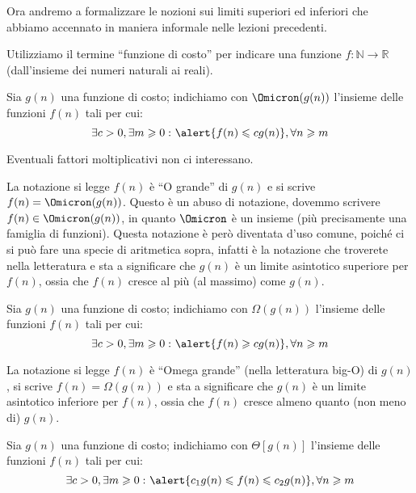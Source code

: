 Ora andremo a formalizzare le nozioni sui limiti superiori ed inferiori che abbiamo accennato in maniera informale nelle lezioni precedenti.

\begin{definition*}
Utilizziamo il termine \enquote{funzione di costo} per indicare una funzione \(f\colon\mathbb{N}\to\mathbb{R}\) (dall'insieme dei numeri naturali ai reali).
\end{definition*}

\begin{definition*}
Sia \(g(n)\) una funzione di costo; indichiamo con \(\Omicron(g(n))\) l'insieme delle funzioni \(f(n)\) tali per cui:
\[
	\exists c > 0, \exists m \geqslant 0\,\colon \alert{f(n) \leqslant cg(n)}, \forall n \geqslant m\]
\end{definition*}

\begin{note}
Eventuali fattori moltiplicativi non ci interessano.
\end{note}

La notazione si legge \(f(n)\) è \enquote{O grande} di \(g(n)\) e si scrive \(f(n) = \Omicron(g(n))\).
Questo è un abuso di notazione, dovemmo scrivere \(f(n) \in \Omicron(g(n))\), in quanto \(\Omicron\) è un insieme (più precisamente una famiglia di funzioni).
Questa notazione è però diventata d'uso comune, poiché ci si può fare una specie di aritmetica sopra, infatti è la notazione che troverete nella letteratura e sta a significare che \(g(n)\) è un limite asintotico superiore per \(f(n)\), ossia che \(f(n)\) cresce al più (al massimo) come \(g(n)\).

\begin{definition*}
Sia \(g(n)\) una funzione di costo; indichiamo con \(\Omega(g(n))\) l'insieme delle funzioni \(f(n)\) tali per cui:
\[
	\exists c > 0, \exists m \geqslant 0\,\colon \alert{f(n) \geqslant cg(n)}, \forall n \geqslant m
\]
\end{definition*}

La notazione si legge \(f(n)\) è \enquote{Omega grande} (nella letteratura big-O) di \(g(n)\), si scrive \(f(n) = \Omega(g(n))\) e sta a significare che \(g(n)\) è un limite asintotico inferiore per \(f(n)\), ossia che \(f(n)\) cresce almeno quanto (non meno di) \(g(n)\).

\begin{definition*}
Sia \(g(n)\) una funzione di costo; indichiamo con \(\Theta[g(n)]\) l'insieme delle funzioni \(f(n)\) tali per cui:
\[
	\exists c > 0, \exists m \geqslant 0\,\colon \alert{c_1g(n) \leqslant f(n) \leqslant c_2g(n)}, \forall n \geqslant m
\]
\end{definition*}

